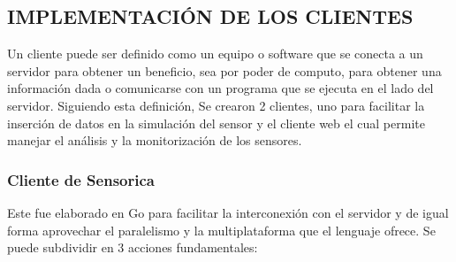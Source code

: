 
\subsection{IMPLEMENTACIÓN DE LOS CLIENTES}

Un cliente puede ser definido como un equipo o software que se conecta a un
servidor para obtener un beneficio, sea por poder de computo, para obtener
una información dada o comunicarse con un programa que se ejecuta en el lado
del servidor. Siguiendo esta definición, Se crearon 2 clientes, uno para
facilitar la inserción de datos en la simulación del sensor y el cliente web
el cual permite manejar el análisis y la monitorización de los sensores.

\subsubsection{Cliente de Sensorica}

Este fue elaborado en Go para facilitar la interconexión con el servidor y
de igual forma aprovechar el paralelismo y la multiplataforma que el
lenguaje ofrece. Se puede subdividir en 3 acciones fundamentales:

